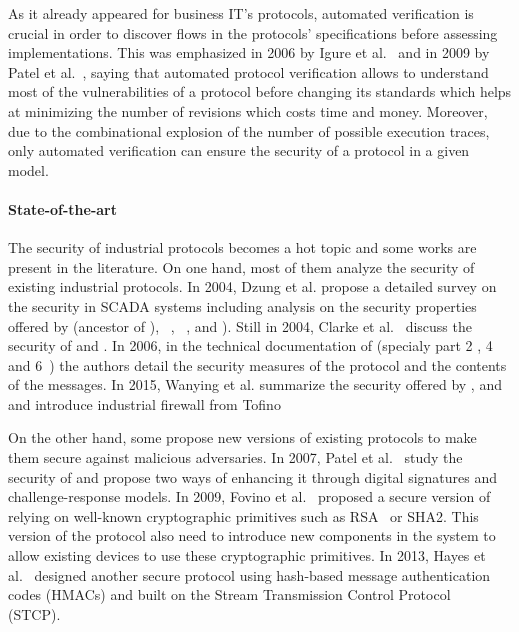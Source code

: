 As it already appeared for business IT's protocols, automated verification is
crucial in order to discover flows in the protocols' specifications before
assessing implementations.
This was emphasized in 2006 by Igure et al.~\cite{ILW06} and in 2009 by Patel et
al.~\cite{PBG09}, saying that automated protocol verification allows to
understand most of the vulnerabilities of a protocol before changing its
standards which helps at minimizing the number of revisions which costs time and
money.
Moreover, due to the combinational explosion of the number of possible execution
traces, only automated verification can ensure the security of a protocol in a
given model.

\paragraph{State-of-the-art}\label{sec:intro_sota}

The security of industrial protocols becomes a hot topic and some works are
present in the literature.
On one hand, most of them analyze the security of existing industrial protocols.
In 2004, Dzung et al. propose a detailed survey on the security in SCADA systems
including analysis on the security properties offered by \opc (ancestor of
\opcua), \mms~\cite{ISO_MMS}, ~\cite{IEC_61850}, \iccp
\cite{IEC_60870} and \etherip).
Still in 2004, Clarke et al.~\cite{CR04} discuss the security of \dnp and
\iccp.
In 2006, in the technical documentation of \opcua (specialy part 2
\cite{opcua_part2}, 4~\cite{opcua_part4} and 6~\cite{opcua_part6}) the authors
detail the security measures of the protocol and the contents of the messages.
In 2015, Wanying et al. summarize the security offered by \modbus, \dnp and \opc
and introduce industrial firewall from Tofino~\cite{TOFINO}

On the other hand, some propose new versions of existing protocols to make them
secure against malicious adversaries.
In 2007, Patel et al.~\cite{PY07} study the security of \dnp and propose two
ways of enhancing it through digital signatures and challenge-response models.
In 2009, Fovino et al.~\cite{FCMT09} proposed a secure version of \modbus
relying on well-known cryptographic primitives such as RSA~\cite{RSA78} or SHA2.
This version of the protocol also need to introduce new components in the system
to allow existing devices to use these cryptographic primitives.
In 2013, Hayes et al.~\cite{HE13} designed another secure \modbus protocol using
hash-based message authentication codes (HMACs) and built on the Stream
Transmission Control Protocol~\cite{Ste07} (STCP).

